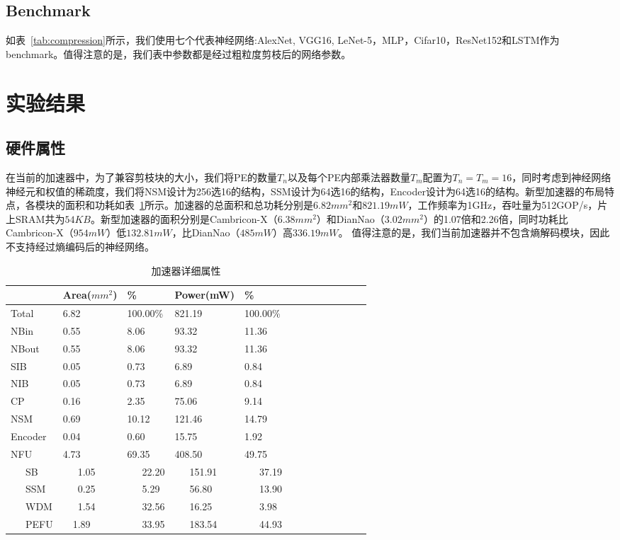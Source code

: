 \subsection{Benchmark}
如表~\ref{tab:compression}所示，我们使用七个代表神经网络:AlexNet, VGG16, LeNet-5，MLP，Cifar10，ResNet152和LSTM作为benchmark。值得注意的是，我们表中参数都是经过粗粒度剪枝后的网络参数。

\section{实验结果}

\subsection{硬件属性}

在当前的加速器中，为了兼容剪枝块的大小，我们将PE的数量$T_n$以及每个PE内部乘法器数量$T_m$配置为$T_n = T_m = 16$，同时考虑到神经网络神经元和权值的稀疏度，我们将NSM设计为256选16的结构，SSM设计为64选16的结构，Encoder设计为64选16的结构。新型加速器的布局特点，各模块的面积和功耗如表~\ref{tab:hardware}所示。加速器的总面积和总功耗分别是$6.82mm^2$和$821.19mW$，工作频率为1GHz，吞吐量为512GOP/s，片上SRAM共为$54KB$。新型加速器的面积分别是Cambricon-X（$6.38mm^2$）和DianNao（$3.02mm^2$）的1.07倍和2.26倍，同时功耗比Cambricon-X（$954mW$）低$132.81mW$，比DianNao（$485mW$）高$336.19mW$。
值得注意的是，我们当前加速器并不包含熵解码模块，因此不支持经过熵编码后的神经网络。

\begin{table}[h]
\caption{加速器详细属性}
\centering
\label{tab:hardware}
\begin{tabular}{lllllllllllll}
\toprule
 & Area($mm^2$) & \% & Power(mW) & \% \\
\midrule
Total   & 6.82	& 100.00\% 	& 821.19    & 100.00\% \\
\midrule
NBin    & 0.55  & 8.06		& 93.32     & 11.36	\\
NBout   & 0.55  & 8.06	    & 93.32     & 11.36	\\
SIB     & 0.05 	& 0.73		& 6.89      & 0.84	\\
NIB     & 0.05  & 0.73      & 6.89      & 0.84  \\
CP      & 0.16 	& 2.35		& 75.06     & 9.14	\\
NSM     & 0.69 	& 10.12		& 121.46    & 14.79	\\
Encoder & 0.04  & 0.60      & 15.75     & 1.92  \\
NFU     & 4.73 	& 69.35 	& 408.50    & 49.75	\\
~~~SB   & ~~~1.05 	& ~~~22.20	& ~~~151.91 & ~~~37.19\\
~~~SSM  & ~~~0.25 	& ~~~5.29	& ~~~56.80  & ~~~13.90	\\
~~~WDM  & ~~~1.54 	& ~~~32.56	& ~~~16.25  & ~~~3.98	\\
~~~PEFU & ~~1.89	& ~~~33.95	& ~~~183.54 & ~~~44.93 \\
\bottomrule
\end{tabular}
\end{table}

